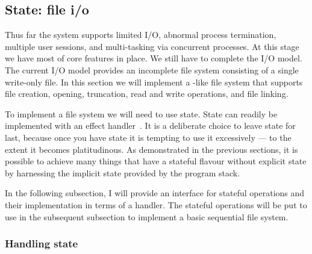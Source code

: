 \documentclass[12pt,phd,lfcs,twoside,openright,logo,leftchapter,normalheadings]{infthesis}
\theoremstyle{plain}
\theoremstyle{definition}
\begin{document}
\subsection{State: file i/o}
\label{sec:tiny-unix-io}

Thus far the system supports limited I/O, abnormal process
termination, multiple user sessions, and multi-tasking via concurrent
processes. At this stage we have most of core features in place. We
still have to complete the I/O model. The current I/O model provides
an incomplete file system consisting of a single write-only file.
%
In this section we will implement a \UNIX{}-like file system that
supports file creation, opening, truncation, read and write
operations, and file linking.
%

To implement a file system we will need to use state. State can
readily be implemented with an effect handler~\cite{KammarLO13}.
%
It is a deliberate choice to leave state for last, because once you
have state it is tempting to use it excessively --- to the extent it
becomes platitudinous.
%
As demonstrated in the previous sections, it is possible to achieve
many things that have a stateful flavour without explicit state by
harnessing the implicit state provided by the program stack.

In the following subsection, I will provide an interface for stateful
operations and their implementation in terms of a handler. The
stateful operations will be put to use in the subsequent subsection to
implement a basic sequential file system.

\subsubsection{Handling state}
\end{document}
